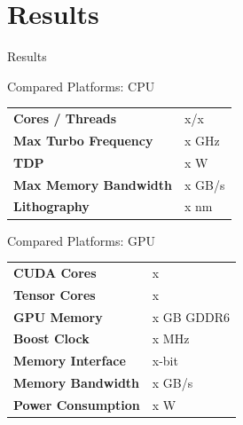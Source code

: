 \setlength{\parskip}{\baselineskip}
\section{Results}

\begin{frame}
	\huge Results
\end{frame}

\begin{frame}{Compared Platforms: CPU}
	\begin{table}[H]
		\centering
		\begin{tabular}{ll}
			\toprule
			\textbf{Cores / Threads}      & x/x      \\
			\textbf{Max Turbo Frequency}  & x GHz   \\
			\textbf{TDP}                  & x W      \\
			\textbf{Max Memory Bandwidth} & x GB/s \\
			\textbf{Lithography}          & x nm     \\
			\bottomrule
		\end{tabular}
	\end{table}
\end{frame}

\begin{frame}{Compared Platforms: GPU}
	\begin{table}[H]
		\centering
		\begin{tabular}{ll}
			\toprule
			\textbf{CUDA Cores}        & x      \\
			\textbf{Tensor Cores}      & x        \\
			\textbf{GPU Memory}        & x GB GDDR6 \\
			\textbf{Boost Clock}       & x MHz  \\
			\textbf{Memory Interface}  & x-bit   \\
			\textbf{Memory Bandwidth}  & x GB/s   \\
			\textbf{Power Consumption} & x W      \\
			\bottomrule
		\end{tabular}
	\end{table}
\end{frame}

